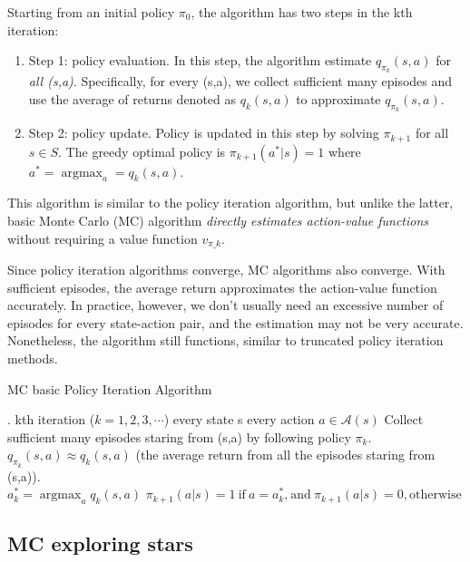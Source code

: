     Starting from an initial policy $\pi_{0}$, the algorithm has two steps in the kth iteration:
    \begin{enumerate}

      \item
            Step 1: policy evaluation. In this step, the algorithm estimate $q_{\pi_{k}}(s,a)$ for \emph{all (s,a)}. Specifically, for every (s,a), we collect
            sufficient many episodes and use the average of returns denoted as $q_{k}(s,a)$ to approximate $q_{\pi_{k}}(s,a)$.
      \item
            Step 2: policy update. Policy is updated in this step by solving $\pi_{k+1}$ for all $s \in S$. The greedy optimal policy is $\pi_{k+1}(a^{*}|s)=1$ where
            $a^{*}=\mathop{\arg\max}_{a}=q_{k}(s,a)$.
    \end{enumerate}
    This algorithm is similar to the policy iteration algorithm, but unlike the latter, basic Monte Carlo (MC) algorithm \emph{directly estimates action-value
      functions} without requiring a value function $v_{\pi\_k}$. \par

    Since policy iteration algorithms converge, MC algorithms also converge. With sufficient episodes, the average return approximates the action-value function
    accurately. In practice, however, we don't usually need an excessive number of episodes for every state-action pair, and the estimation may not be very
    accurate. Nonetheless, the algorithm still functions, similar to truncated policy iteration methods.
    \begin{algorithm}
      \caption{MC basic Policy Iteration Algorithm}  .
      \For
      {kth iteration ($k=1,2,3,\cdots$)}{
        \For
        {every state s}{
          \For
          {every action $a \in \mathcal{A}(s)$}{ Collect sufficient many episodes staring from (s,a) by following policy $\pi_{k}$. \\ 
            $q_{\pi_{k}}(s,a) \approx q_{k}(s,a)$ (the average return from all the episodes staring from (s,a)). \\

          }  $a^{*}_{k}=\mathop{\arg \max}_aq_k(s,a)$ $\pi_{k+1}(a|s)=1 \ \text{if} \ a=a_k^* \text{,} \ \text{and} \ \pi_{k+1}(a|s)=0,
            \text{otherwise}$ }}
    \end{algorithm}

  \subsection{MC exploring stars}


